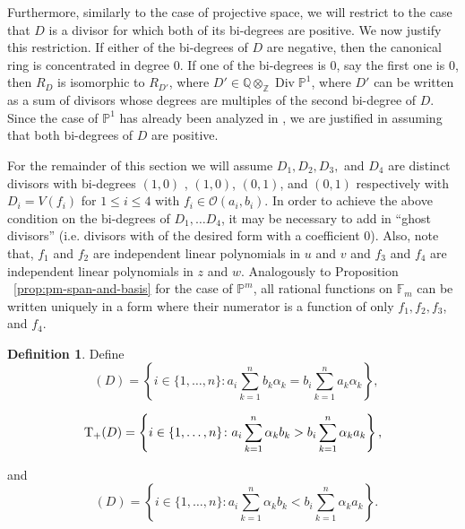 \documentclass{amsart}
\theoremstyle{plain}
\theoremstyle{definition}
\newtheorem{defn}[thm]{Definition}
\theoremstyle{remark}
\numberwithin{equation}{section}
\newcommand\bq{{\mathbb Q}}
\newcommand\bp{{\mathbb P}}
\newcommand\bz{{\mathbb Z}}
\newcommand\sco{{\mathscr O}}
\DeclareMathOperator\di{Div}
\newcommand\bida{a}
\newcommand\bidb{b}
\newcommand\hirz{\mathbb{F}}
\DeclareMathOperator{\Te}{T_=}
\DeclareMathOperator{\Tp}{T_+}
\DeclareMathOperator{\Tm}{T_-}
\begin{document}
Furthermore, similarly to the case of projective space, 
we will restrict to the case that $D$ is a divisor
for which both of its bi-degrees are positive. We now justify this
restriction. If either of the bi-degrees of $D$ are negative,
then the canonical ring is concentrated in degree 0. If one of the
bi-degrees is 0, say the first one is 0, then $R_D$ is isomorphic
to $R_{D'}$, where $D' \in \bq \otimes_\bz \di \bp^1$, 
where $D'$ can be written as a sum of divisors whose degrees
are multiples of the second bi-degree of $D$. Since the case of
$\bp^1$ has already been analyzed in \cite{dorney:canonical}, we
are justified in assuming that both bi-degrees of $D$ are positive.


For the remainder of this section we will assume $D_1, D_2, D_3,$ and $D_4$ are
distinct divisors with bi-degrees $(1,0)$
, $(1,0)$, $(0,1)$, and $(0,1)$ respectively with $D_i = V(f_i)$ for $1 \leq i \leq 4$ with $f_i \in \sco(\bida_i, \bidb_i)$.  
In order to achieve the above condition on the bi-degrees of
$D_1, \ldots D_4$, it may be necessary to add in ``ghost divisors'' (i.e.
divisors with of the desired form with a coefficient $0$).
Also, note that, $f_1$ and $f_2$ are independent linear
polynomials in $u$ and $v$ and $f_3$ and $f_4$ are independent
linear polynomials in $z$ and $w$.
Analogously to Proposition ~\ref{prop:pm-span-and-basis} for the case
of $\bp^m$, all rational functions on $\hirz_m$
can be written uniquely in a form where their numerator is a function
of only $f_1,f_2,f_3$, and $f_4$.

\begin{defn}
Define 
\begin{equation*}
	\Te(D) = \left\{i \in \{1, \ldots, n\}: \bida_i \sum_{k=1}^n \bidb_k 
\alpha_k = \bidb_i \sum_{k=1}^n \bida_k \alpha_k \right\},
\end{equation*}

\begin{equation*}
	\Tp(D) = \left\{ i \in \{1, \ldots, n\}\colon  \vphantom{\sum_{k = 1}^n} 
	\bida_i \sum_{k = 1}^n \alpha_k \bidb_k > \bidb_i \sum_{k = 1}^n \alpha_k \bida_k 
\right\},
\end{equation*}

\noindent
and
\begin{equation*}
	\Tm(D) = \left\{ i \in \{1, \ldots, n\}\colon \bida_i \sum_{k = 1}^n \alpha_k
	\bidb_k < \bidb_i \sum_{k=1}^n \alpha_k \bida_k \right\}.
\end{equation*}
\end{defn}
\end{document}
